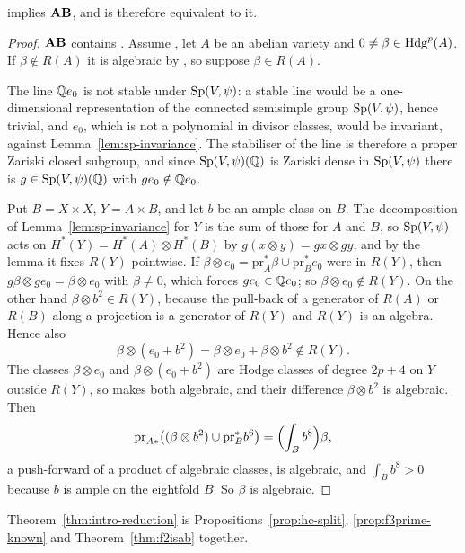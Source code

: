 \begin{theorem}\label{thm:f2isab}
\Fii{} implies $\mathbf{AB}$, and is therefore equivalent to it.
\end{theorem}

\begin{proof}
$\mathbf{AB}$ contains \Fii{}. Assume \Fii{}, let $A$ be an abelian variety and $0\ne\beta\in\mathrm{Hdg}^{p}(A)$. If $\beta\notin R(A)$ it is algebraic by \Fii{}, so suppose $\beta\in R(A)$.

The line $\mathbb{Q} e_{0}$ is not stable under $\mathrm{Sp}(V,\psi)$: a stable line would be a one-dimensional representation of the connected semisimple group $\mathrm{Sp}(V,\psi)$, hence trivial, and $e_{0}$, which is not a polynomial in divisor classes, would be invariant, against Lemma~\ref{lem:sp-invariance}. The stabiliser of the line is therefore a proper Zariski closed subgroup, and since $\mathrm{Sp}(V,\psi)(\mathbb{Q})$ is Zariski dense in $\mathrm{Sp}(V,\psi)$ \cite[Cor.~18.3]{Bor91} there is $g\in\mathrm{Sp}(V,\psi)(\mathbb{Q})$ with $ge_{0}\notin\mathbb{Q} e_{0}$.

Put $B=X\times X$, $Y=A\times B$, and let $b$ be an ample class on $B$. The decomposition of Lemma~\ref{lem:sp-invariance} for $Y$ is the sum of those for $A$ and $B$, so $\mathrm{Sp}(V,\psi)$ acts on $H^{*}(Y)=H^{*}(A)\otimes H^{*}(B)$ by $g(x\otimes y)=gx\otimes gy$, and by the lemma it fixes $R(Y)$ pointwise. If $\beta\otimes e_{0}=\mathrm{pr}_{A}^{*}\beta\cup\mathrm{pr}_{B}^{*}e_{0}$ were in $R(Y)$, then $g\beta\otimes ge_{0}=\beta\otimes e_{0}$ with $\beta\ne0$, which forces $ge_{0}\in\mathbb{Q} e_{0}$; so $\beta\otimes e_{0}\notin R(Y)$. On the other hand $\beta\otimes b^{2}\in R(Y)$, because the pull-back of a generator of $R(A)$ or $R(B)$ along a projection is a generator of $R(Y)$ and $R(Y)$ is an algebra. Hence also
\[
\beta\otimes(e_{0}+b^{2})=\beta\otimes e_{0}+\beta\otimes b^{2}\notin R(Y).
\]
The classes $\beta\otimes e_{0}$ and $\beta\otimes(e_{0}+b^{2})$ are Hodge classes of degree $2p+4$ on $Y$ outside $R(Y)$, so \Fii{} makes both algebraic, and their difference $\beta\otimes b^{2}$ is algebraic. Then
\[
\mathrm{pr}_{A*}\bigl((\beta\otimes b^{2})\cup\mathrm{pr}_{B}^{*}b^{6}\bigr)=\Bigl(\int_{B}b^{8}\Bigr)\beta,
\]
a push-forward of a product of algebraic classes, is algebraic, and $\int_{B}b^{8}>0$ because $b$ is ample on the eightfold $B$. So $\beta$ is algebraic.
\end{proof}

Theorem~\ref{thm:intro-reduction} is Propositions~\ref{prop:hc-split}, \ref{prop:f3prime-known} and Theorem~\ref{thm:f2isab} together.

